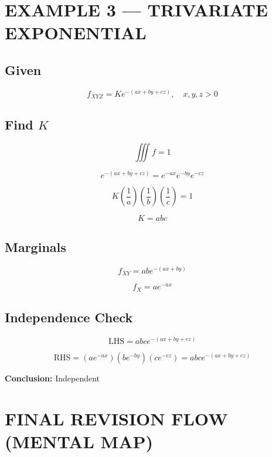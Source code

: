 \documentclass[12pt]{article}
\begin{document}
\section{EXAMPLE 3 — TRIVARIATE EXPONENTIAL}

\subsection*{Given}

\[
f_{XYZ} = K e^{-(ax + by + cz)}, \quad x,y,z > 0
\]

\subsection*{Find $K$}

\[
\iiint f = 1
\]

\[
e^{-(ax+by+cz)} = e^{-ax} e^{-by} e^{-cz}
\]

\[
K \left(\frac{1}{a}\right)\left(\frac{1}{b}\right)\left(\frac{1}{c}\right) = 1
\]

\[
K = abc
\]

\subsection*{Marginals}

\[
f_{XY} = ab e^{-(ax+by)}
\]

\[
f_X = a e^{-ax}
\]

\subsection*{Independence Check}

\[
\text{LHS} = abc e^{-(ax+by+cz)}
\]

\[
\text{RHS} = (ae^{-ax})(be^{-by})(ce^{-cz}) = abc e^{-(ax+by+cz)}
\]

\textbf{Conclusion:} Independent

\section{FINAL REVISION FLOW (MENTAL MAP)}
\end{document}
